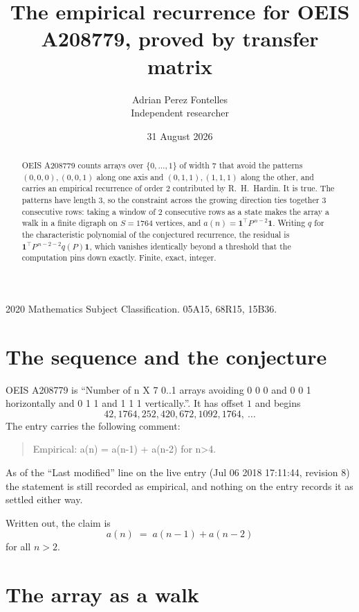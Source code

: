 \documentclass[11pt,a4paper]{article}
\title{The empirical recurrence for OEIS A208779, proved by transfer matrix}
\author{Adrian Perez Fontelles\\ \small Independent researcher}
\date{31 August 2026}
\theoremstyle{plain}
\theoremstyle{definition}
\begin{document}
\maketitle

\begin{abstract}
OEIS A208779 counts arrays over $\{0,\dots,1\}$ of width $7$ that avoid the patterns
$(0,0,0), (0,0,1)$ along one axis and $(0,1,1), (1,1,1)$ along the other, and carries an empirical recurrence of
order $2$ contributed by R.~H.~Hardin. It is true. The patterns have length $3$, so
the constraint across the growing direction ties together $3$ consecutive rows: taking a
window of $2$ consecutive rows as a state makes the array a walk in a finite digraph
on $S=1764$ vertices, and $a(n)=\mathbf{1}^{\!\top}P^{\,n-2}\mathbf{1}$. Writing $q$
for the characteristic polynomial of the conjectured recurrence, the residual is
$\mathbf{1}^{\!\top}P^{\,n-2-2}q(P)\mathbf{1}$, which vanishes identically
beyond a threshold that the computation pins down exactly. Finite, exact, integer.
\end{abstract}

\noindent\small 2020 Mathematics Subject Classification. 05A15, 68R15, 15B36.\normalsize

\section{The sequence and the conjecture}

OEIS A208779 is ``Number of n X 7 0..1 arrays avoiding 0 0 0 and 0 0 1 horizontally and 0 1 1 and 1 1 1 vertically.''. It has offset
$1$ and begins
\[
42, 1764, 252, 420, 672, 1092, 1764,\ \dots
\]
The entry carries the following comment:
\begin{quote}\small
Empirical: a(n) = a(n-1) + a(n-2) for n>4.
\end{quote}
As of the ``Last modified'' line on the live entry (Jul 06 2018 17:11:44, revision
8) the statement is still recorded as empirical, and nothing on the entry
records it as settled either way.

Written out, the claim is
\begin{equation}\label{eq:conj}
a(n)\;=\;a(n-1) + a(n-2)
\end{equation}
for all $n>2$. 

\section{The array as a walk}
\end{document}
